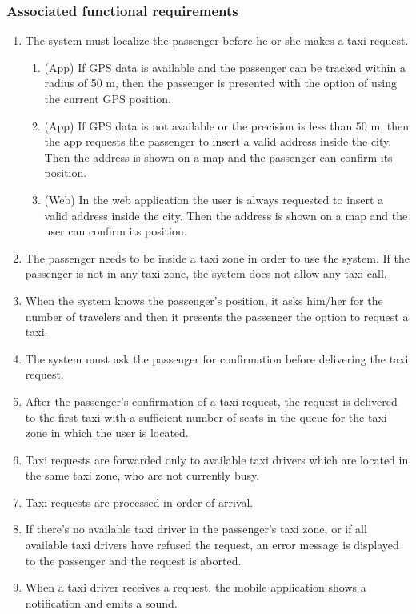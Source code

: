 \subsubsection{Associated functional requirements}
\begin{enumerate}
	\item The system must localize the passenger before he or she makes a taxi request.
	\begin{enumerate}
		\item (App) If GPS data is available and the passenger can be tracked within a radius of 50 m, then the passenger is presented with the option of using the current GPS position.
		\item (App) If GPS data is not available or the precision is less than 50 m, then the app requests the passenger to insert a valid address inside the city. Then the address is shown on a map and the passenger can confirm its position.
		\item (Web) In the web application the user is always requested to insert a valid address inside the city. Then the address is shown on a map and the user can confirm its position.
	\end{enumerate}
	\item The passenger needs to be inside a taxi zone in order to use the system. If the passenger is not in any taxi zone, the system does not allow any taxi call.
	\item When the system knows the passenger's position, it asks him/her for the number of travelers and then it presents the passenger the option to request a taxi.
	\item The system must ask the passenger for confirmation before delivering the taxi request.
	\item After the passenger's confirmation of a taxi request, the request is delivered to the first taxi with a sufficient number of seats in the queue for the taxi zone in which the user is located.
	\item Taxi requests are forwarded only to available taxi drivers which are located in the same taxi zone, who are not currently busy.
	\item Taxi requests are processed in order of arrival.
	\item If there's no available taxi driver in the passenger's taxi zone, or if all available taxi drivers have refused the request, an error message is displayed to the passenger and the request is aborted.
	\item When a taxi driver receives a request, the mobile application shows a notification and emits a sound.

\end{enumerate}
